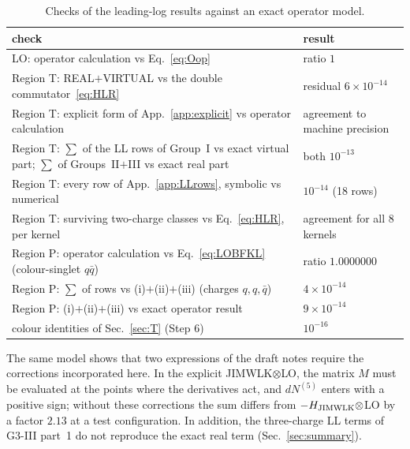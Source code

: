 \documentclass[aps,prd,onecolumn,superscriptaddress,nofootinbib,floatfix,longbibliography,11pt]{revtex4-2}
\numberwithin{equation}{section}
\begin{document}
\begin{table}[!htbp]
\centering
\small
\renewcommand{\arraystretch}{1.2}
\begin{tabular}{p{9.6cm}p{5.4cm}}
\toprule
check & result\\
\midrule
LO: operator calculation vs Eq.~\eqref{eq:Oop} & ratio $1$\\
Region T: REAL$+$VIRTUAL vs the double commutator~\eqref{eq:HLR} & residual $6\times10^{-14}$\\
Region T: explicit form of App.~\ref{app:explicit} vs operator calculation & agreement to machine precision\\
Region T: $\sum$ of the LL rows of Group~I vs exact virtual part; $\sum$ of Groups~II$+$III vs exact real part & both $10^{-13}$\\
Region T: every row of App.~\ref{app:LLrows}, symbolic vs numerical & $10^{-14}$ (18 rows)\\
Region T: surviving two-charge classes vs Eq.~\eqref{eq:HLR}, per kernel & agreement for all 8 kernels\\
Region P: operator calculation vs Eq.~\eqref{eq:LOBFKL} (colour-singlet $q\bar q$) & ratio $1.0000000$\\
Region P: $\sum$ of rows vs (i)$+$(ii)$+$(iii) (charges $q,q,\bar q$) & $4\times10^{-14}$\\
Region P: (i)$+$(ii)$+$(iii) vs exact operator result & $9\times10^{-14}$\\
colour identities of Sec.~\ref{sec:T} (Step 6) & $10^{-16}$\\
\bottomrule
\end{tabular}
\caption{Checks of the leading-log results against an exact operator model.}
\label{tab:checksLL}
\end{table}

The same model shows that two expressions of the draft notes require the corrections incorporated here. In the explicit JIMWLK$\otimes$LO, the matrix $M$ must be evaluated at the points where the derivatives act, and $dN^{(5)}$ enters with a positive sign; without these corrections the sum differs from $-H_{\rm JIMWLK}\otimes$LO by a factor $2.13$ at a test configuration. In addition, the three-charge LL terms of G3-III part~1 do not reproduce the exact real term (Sec.~\ref{sec:summary}).
\end{document}

